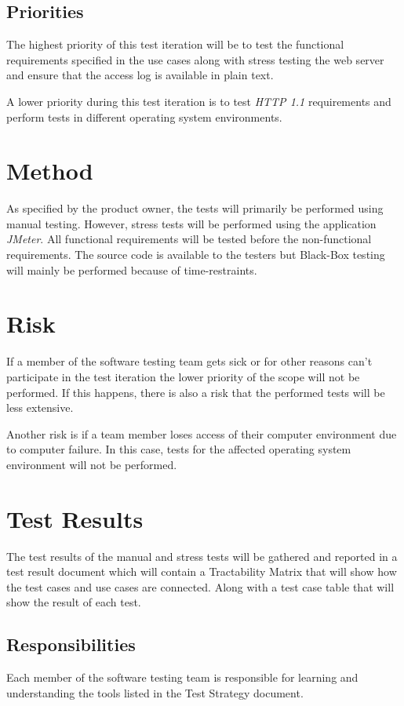 \documentclass[a4paper, 12pt]{article}
\begin{document}
\subsection{Priorities}
The highest priority of this test iteration will be to test the functional requirements specified in the use cases along with stress testing the web server and ensure that the access log is available in plain text.

A lower priority during this test iteration is to test \textit{HTTP 1.1} requirements and perform tests in different operating system environments.

\section{Method}
As specified by the product owner, the tests will primarily be performed using manual testing. However, stress tests will be performed using the application \textit{JMeter}. All functional requirements will be tested before the non-functional requirements. The source code is available to the testers but Black-Box testing will mainly be performed because of time-restraints.

\section{Risk}
If a member of the software testing team gets sick or for other reasons can't participate in the test iteration the lower priority of the scope will not be performed. If this happens, there is also a risk that the performed tests will be less extensive. 

Another risk is if a team member loses access of their computer environment due to computer failure. In this case, tests for the affected operating system environment will not be performed.

\section{Test Results}
The test results of the manual and stress tests will be gathered and reported in a test result document which will contain a Tractability Matrix that will show how the test cases and use cases are connected. Along with a test case table that will show the result of each test.

\subsection{Responsibilities}
Each member of the software testing team is responsible for learning and understanding the tools listed in the Test Strategy document. 
\end{document}
